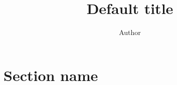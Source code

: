 \documentclass[a4paper,11pt]{article}
\title{Default title}
\author{Author}
\date{}
\begin{document}
\maketitle
\newpage
\tableofcontents

\newpage


\section{Section name}
  
\end{document}
